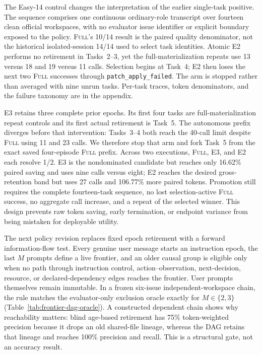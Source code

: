 \documentclass[11pt]{article}
\begin{document}
The Easy-14 control changes the interpretation of the earlier single-task
positive.  The sequence comprises one continuous ordinary-role transcript over
fourteen clean official workspaces, with no evaluator issue identifier or
explicit boundary exposed to the policy.  \textsc{Full}'s 10/14 result is the
paired quality denominator, not the historical isolated-session 14/14 used to
select task identities.  Atomic E2 performs no retirement in Tasks~2--3, yet
the full-materialization repeats use 13 versus 18 and 19 versus 11 calls.
Selection begins at Task~4; E2 then loses the next two \textsc{Full} successes
through \texttt{patch\_apply\_failed}.  The arm is stopped rather than averaged
with nine unrun tasks.  Per-task traces, token denominators, and the failure
taxonomy are in the appendix.

E3 retains three complete prior epochs.  Its first four tasks are
full-materialization repeat controls and its first actual retirement is
Task~5.  The autonomous prefix diverges before that intervention: Tasks~3--4
both reach the 40-call limit despite \textsc{Full} using 11 and 23 calls.
We therefore stop that arm and fork Task~5 from the exact saved four-episode
\textsc{Full} prefix.  Across two executions, \textsc{Full}, E3, and E2 each
resolve 1/2.  E3 is the nondominated candidate but reaches only 16.62\% paired
saving and uses nine calls versus eight; E2 reaches the desired gross-retention
band but uses 27 calls and 106.77\% more paired tokens.  Promotion still
requires the complete fourteen-task sequence, no lost selection-active
\textsc{Full} success, no aggregate call increase, and a repeat of the selected
winner.  This design prevents raw token saving, early termination, or endpoint
variance from being mistaken for deployable utility.

The next policy revision replaces fixed epoch retirement with a forward
information-flow test.  Every genuine user message starts an instruction
epoch, the last $M$ prompts define a live frontier, and an older causal group is
eligible only when no path through instruction control, action--observation,
next-decision, resource, or declared-dependency edges reaches the frontier.
User prompts themselves remain immutable.  In a frozen six-issue
independent-workspace chain, the rule matches the evaluator-only exclusion
oracle exactly for $M\in\{2,3\}$ (Table~\ref{tab:frontier-dag-oracle}).  A
constructed dependent chain shows why reachability matters: blind age-based
retirement has 75\% token-weighted precision because it drops an old shared-file
lineage, whereas the DAG retains that lineage and reaches 100\% precision and
recall.  This is a structural gate, not an accuracy result.
\end{document}
